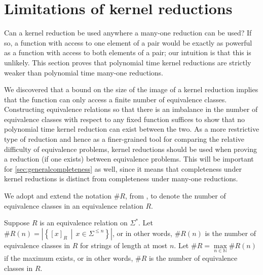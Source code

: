 \section{Limitations of kernel reductions}\label{sec:limitations}
%
Can a kernel reduction be used anywhere a many-one reduction can be used?
If so, a function with access to one element of a pair would be exactly as powerful as a function with access to both elements of a pair; our intuition is that this is unlikely.
This section proves that polynomial time kernel reductions are strictly weaker than polynomial time many-one reductions.

%
We discovered that a bound on the size of the image of a kernel reduction implies that the function can only access a finite number of equivalence classes.
Constructing equivalence relations so that there is an imbalance in the number of equivalence classes with respect to any fixed function suffices to show that no polynomial time kernel reduction can exist between the two.
As a more restrictive type of reduction and hence as a finer-grained tool for comparing the relative difficulty of equivalence problems, kernel reductions should be used when proving a reduction (if one exists) between equivalence problems.
This will be important for \autoref{sec:generalcompleteness} as well, since it means that completeness under kernel reductions is distinct from completeness under many-one reductions.

We adopt and extend the notation $\#R$, from \autocite{bcffm}, to denote the number of equivalence classes in an equivalence relation $R$.

\begin{definition}%
  Suppose $R$ is an equivalence relation on $\Sigma^*$.
  Let $\#R(n) = \left|\left\{[x]_R \, \middle| \, x \in \Sigma^{\leq n}\right\}\right|$, or in other words, $\#R(n)$ is the number of equivalence classes in $R$ for strings of length at most $n$.
  Let $\#R = \max\limits_{n \in \mathbb{N}} \#R(n)$ if the maximum exists, or in other words, $\#R$ is the number of equivalence classes in $R$.
\end{definition}

